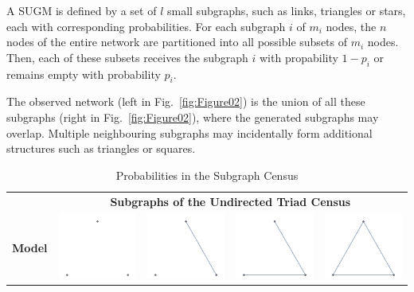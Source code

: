 \documentclass[conference]{IEEEtran}
\begin{document}
A SUGM is defined by a set of $l$ small subgraphs, such as links, triangles or stars, each with corresponding probabilities. For each subgraph $i$ of $m_{i}$ nodes, the $n$ nodes of the entire network are partitioned into all possible subsets of $m_{i}$ nodes. Then, each of these subsets receives the subgraph $i$ with propability $1-p_{i}$ or remains empty with probability $p_{i}$.

The observed network (left in Fig.~\ref{fig:Figure02}) is the union of all these subgraphs (right in Fig.~\ref{fig:Figure02}), where the generated subgraphs may overlap. Multiple neighbouring subgraphs may incidentally form additional structures such as triangles or squares.

\begin{table}[h!]
\def\arraystretch{1.6}
\caption{Probabilities in the Subgraph Census}
\begin{center}
\begin{tabular}{|c|c|c|c|c|}
\hline
\textbf{}&\multicolumn{4}{|c|}{\textbf{Subgraphs of the Undirected Triad Census}} \\
\cline{2-5}
\textbf{Model}&\includegraphics[scale=0.8]{Figure03_1.pdf}&\includegraphics[scale=.8]{Figure03_2.pdf}&\includegraphics[scale=.8]{Figure03_3.pdf}&\includegraphics[scale=.8]{Figure03_4.pdf}\\

\end{tabular}
\end{center}
\end{table}
\end{document}
